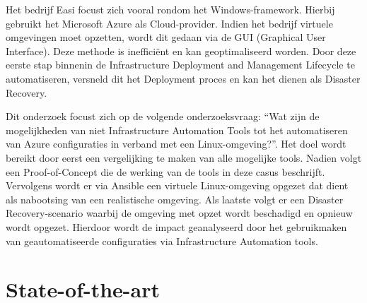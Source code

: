 Het bedrijf Easi focust zich vooral rondom het Windows-framework. Hierbij gebruikt het Microsoft Azure \autocite{Microsoft2022} als Cloud-provider. Indien het bedrijf virtuele omgevingen moet opzetten, wordt dit gedaan via de GUI (Graphical User Interface). Deze methode is inefficiënt en kan geoptimaliseerd worden. Door deze eerste stap binnenin de Infrastructure Deployment and Management Lifecycle te automatiseren, versneld dit het Deployment proces en kan het dienen als Disaster Recovery. 

Dit onderzoek focust zich op de volgende onderzoeksvraag: “Wat zijn de mogelijkheden van niet Infrastructure Automation Tools tot het automatiseren van Azure configuraties in verband met een Linux-omgeving?”. Het doel wordt bereikt door eerst een vergelijking te maken van alle mogelijke tools. Nadien volgt een Proof-of-Concept die de werking van de tools in deze casus beschrijft. Vervolgens wordt er via Ansible een virtuele Linux-omgeving opgezet dat dient als nabootsing van een realistische omgeving. Als laatste volgt er een Disaster Recovery-scenario waarbij de omgeving met opzet wordt beschadigd en opnieuw wordt opgezet. Hierdoor wordt de impact geanalyseerd door het gebruikmaken van geautomatiseerde configuraties via Infrastructure Automation tools.




\section{State-of-the-art}%
\label{sec:state-of-the-art}

